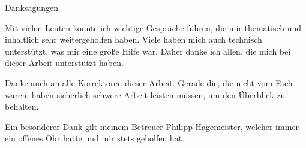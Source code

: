 \begin{center} 
	\huge Danksagungen
\end{center}
Mit vielen Leuten konnte ich wichtige Gespräche führen, die mir thematisch und inhaltlich sehr weitergeholfen haben. Viele haben mich auch technisch unterstützt, was mir eine große Hilfe war. Daher danke ich allen, die mich bei dieser Arbeit unterstützt haben.\par

Danke auch an alle Korrektoren dieser Arbeit. Gerade die, die nicht vom Fach waren, haben sicherlich schwere Arbeit leisten müssen, um den Überblick zu behalten.\par

Ein besonderer Dank gilt meinem Betreuer Philipp Hagemeister, welcher immer ein offenes Ohr hatte und mir stets geholfen hat.